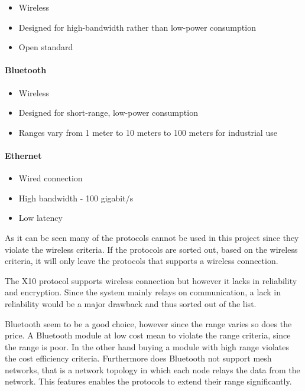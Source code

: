 \begin{itemize}
\item Wireless
\item Designed for high-bandwidth rather than low-power consumption
\item Open standard
\end{itemize}


\paragraph{Bluetooth} \cite{wiki_bluetooth}

\begin{itemize}
\item Wireless
\item Designed for short-range, low-power consumption
\item Ranges vary from 1 meter to 10 meters to 100 meters for industrial use
\end{itemize}

\paragraph{Ethernet} \cite{wiki_ethernet}

\begin{itemize}
\item Wired connection
\item High bandwidth - 100 gigabit/s
\item Low latency
\end{itemize}

As it can be seen many of the protocols cannot be used in this project since they violate the wireless criteria. If the protocols are sorted out, based on the wireless criteria, it will only leave the protocols that supports a wireless connection. 


The X10 protocol supports wireless connection but however it lacks in reliability and encryption. Since the system mainly relays on communication, a lack in reliability would be a major drawback and thus sorted out of the list.


Bluetooth seem to be a good choice, however since the range varies so does the price. A Bluetooth module at low cost  mean to violate the range criteria, since the range is poor. In the other hand buying a module with high range violates the cost efficiency criteria. Furthermore does Bluetooth not support mesh networks, that is a network topology in which each node relays the data from the network. This features enables the protocols to extend their range significantly. 


